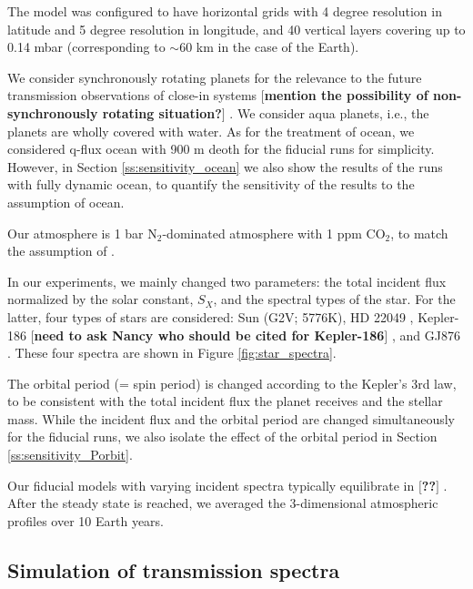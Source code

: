 \documentclass[11pt,numberedappendix,twocolappendix,]{emulateapj}
\def\memo#1{\color{red}$[${\bf #1}$]$ \color{black}}
\begin{document}
The model was configured to have horizontal grids with 4 degree resolution in latitude and 5 degree resolution in longitude, and 40 vertical layers covering up to 0.14 mbar (corresponding to $\sim 60$ km in the case of the Earth). 

We consider synchronously rotating planets for the relevance to the future transmission observations of close-in systems \memo{mention the possibility of non-synchronously rotating situation?}. 
We consider aqua planets, i.e., the planets are wholly covered with water. 
As for the treatment of ocean, we considered q-flux ocean with 900 m deoth for the fiducial runs for simplicity. However, in Section \ref{ss:sensitivity_ocean} we also show the results of the runs with fully dynamic ocean, to quantify the sensitivity of the results to the assumption of ocean. 

Our atmosphere is 1 bar N$_2$-dominated atmosphere with 1 ppm CO$_2$, to match the assumption of \citet{Kopparapu2016}. 

In our experiments, we mainly changed two parameters: the total incident flux normalized by the solar constant, $S_X$, and the spectral types of the star. 
For the latter, four types of stars are considered: Sun (G2V; 5776K), HD 22049 \citep[][K2V, 5084K, $0.82M_{\odot }$, $0.73R_{\odot }$]{Segura2003}, Kepler-186 \citep[][M1V, 3755K, $0.54M_{\odot }$, $0.52R_{\odot }$]{}\memo{need to ask Nancy who should be cited for Kepler-186}, and GJ876 \citep[][M4V, 3473K, $0.334M_{\odot }$, $0.36R_{\odot }$]{Domagal-Goldman2014}. 
These four spectra are shown in Figure \ref{fig:star_spectra}. 

The orbital period (= spin period) is changed according to the Kepler's 3rd law, to be consistent with the total incident flux the planet receives and the stellar mass. While the incident flux and the orbital period are changed simultaneously for the fiducial runs, we also isolate the effect of the orbital period in Section \ref{ss:sensitivity_Porbit}. 

Our fiducial models with varying incident spectra typically equilibrate in \memo{??}. 
After the steady state is reached, we averaged the 3-dimensional atmospheric profiles over 10 Earth years. 



\subsection{Simulation of transmission spectra}
\end{document}

